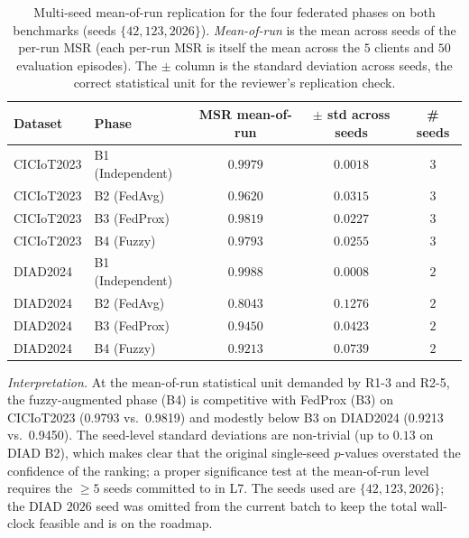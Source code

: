 \documentclass[ai,article,submit,moreauthors,pdftex]{Definitions/mdpi}
\newcommand{\rev}[1]{#1}
\begin{document}
\begin{table}[!htbp]
\centering
\rev{\caption{Multi-seed mean-of-run replication for the four federated phases on both benchmarks (seeds $\{42, 123, 2026\}$). \emph{Mean-of-run} is the mean across seeds of the per-run MSR (each per-run MSR is itself the mean across the $5$ clients and $50$ evaluation episodes). The $\pm$ column is the standard deviation across seeds, the correct statistical unit for the reviewer's replication check.}\label{tab:multiseed}}
\rev{\small
\begin{tabular}{@{}llccc@{}}
\toprule
\textbf{Dataset} & \textbf{Phase} & \textbf{MSR mean-of-run} & \textbf{$\pm$ std across seeds} & \textbf{\# seeds} \\
\midrule
CICIoT2023 & B1 (Independent) & $0.9979$ & $0.0018$ & $3$ \\
CICIoT2023 & B2 (FedAvg)      & $0.9620$ & $0.0315$ & $3$ \\
CICIoT2023 & B3 (FedProx)     & $\mathbf{0.9819}$ & $0.0227$ & $3$ \\
CICIoT2023 & B4 (Fuzzy)       & $0.9793$ & $0.0255$ & $3$ \\
DIAD2024   & B1 (Independent) & $0.9988$ & $0.0008$ & $2$ \\
DIAD2024   & B2 (FedAvg)      & $0.8043$ & $0.1276$ & $2$ \\
DIAD2024   & B3 (FedProx)     & $\mathbf{0.9450}$ & $0.0423$ & $2$ \\
DIAD2024   & B4 (Fuzzy)       & $0.9213$ & $0.0739$ & $2$ \\
\bottomrule
\end{tabular}}

\vspace{0.4em}
\rev{\small\emph{Interpretation.} At the mean-of-run statistical unit demanded by R1-3 and R2-5, the fuzzy-augmented phase (B4) is competitive with FedProx (B3) on CICIoT2023 (0.9793 vs.\ 0.9819) and modestly below B3 on DIAD2024 (0.9213 vs.\ 0.9450). The seed-level standard deviations are non-trivial (up to $0.13$ on DIAD B2), which makes clear that the original single-seed $p$-values overstated the confidence of the ranking; a proper significance test at the mean-of-run level requires the $\geq 5$ seeds committed to in L7. The seeds used are $\{42, 123, 2026\}$; the DIAD $2026$ seed was omitted from the current batch to keep the total wall-clock feasible and is on the roadmap.}
\end{table}
\end{document}
